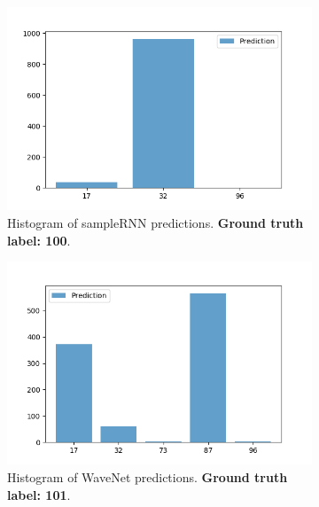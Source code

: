 \begin{figure}[t]
    \centering
    \begin{subfigure}[b]{0.3\textwidth}
        \includegraphics[width=\textwidth]{./fig/pred_histogram_cathy.png}
        \caption{Histogram of sampleRNN predictions. \textbf{Ground truth label: 100}.}
        \label{fig:pred_sampleRNN}
    \end{subfigure}
    \quad
    \begin{subfigure}[b]{0.3\textwidth}
        \includegraphics[width=\textwidth]{./fig/pred_histogram_p280.png}
        \caption{Histogram of WaveNet predictions. \textbf{Ground truth label: 101}.}
        \label{fig:pred_wavenet}
    \end{subfigure}
    \quad
    \begin{subfigure}[b]{0.4\textwidth}

\end{subfigure}
\end{figure}
